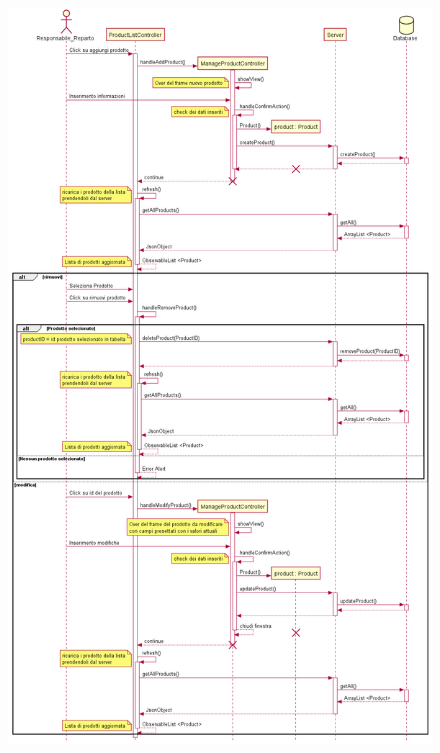 \documentclass[12pt, a4paper]{article}
\begin{document}
\begin{figure}[H]
\centering
\includegraphics[width=\linewidth]{sequence_gestione_prodotto.png}

\end{figure}
\end{document}
